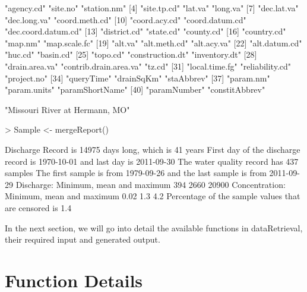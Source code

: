 \documentclass[a4paper,11pt]{article}
\begin{document}
\begin{Schunk}
\begin{Soutput}
 [1] "agency.cd"             "site.no"               "station.nm"           
 [4] "site.tp.cd"            "lat.va"                "long.va"              
 [7] "dec.lat.va"            "dec.long.va"           "coord.meth.cd"        
[10] "coord.acy.cd"          "coord.datum.cd"        "dec.coord.datum.cd"   
[13] "district.cd"           "state.cd"              "county.cd"            
[16] "country.cd"            "map.nm"                "map.scale.fc"         
[19] "alt.va"                "alt.meth.cd"           "alt.acy.va"           
[22] "alt.datum.cd"          "huc.cd"                "basin.cd"             
[25] "topo.cd"               "construction.dt"       "inventory.dt"         
[28] "drain.area.va"         "contrib.drain.area.va" "tz.cd"                
[31] "local.time.fg"         "reliability.cd"        "project.no"           
[34] "queryTime"             "drainSqKm"             "staAbbrev"            
[37] "param.nm"              "param.units"           "paramShortName"       
[40] "paramNumber"           "constitAbbrev"        
\end{Soutput}
\begin{Soutput}
[1] "Missouri River at Hermann, MO"
\end{Soutput}
\begin{Sinput}
> Sample <- mergeReport()
\end{Sinput}
\begin{Soutput}
 Discharge Record is 14975 days long, which is 41 years
 First day of the discharge record is 1970-10-01 and last day is 2011-09-30
 The water quality record has 437 samples
 The first sample is from 1979-09-26 and the last sample is from 2011-09-29
 Discharge: Minimum, mean and maximum 394 2660 20900
 Concentration: Minimum, mean and maximum 0.02 1.3 4.2
 Percentage of the sample values that are censored is 1.4 %
\end{Soutput}
\end{Schunk}


In the next section, we will go into detail the available functions in dataRetrieval, their required input and generated output.

\newpage
\section{Function Details}
\end{document}
